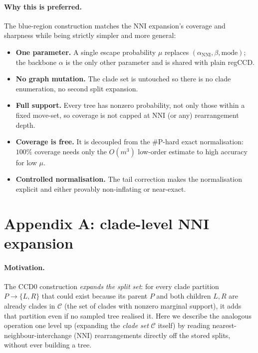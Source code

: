 \documentclass{article}
\newcommand{\CC}{\mathcal{C}}
\begin{document}
\paragraph{Why this is preferred.}
The blue-region construction matches the NNI expansion's coverage and sharpness
while being strictly simpler and more general:
\begin{itemize}
  \item \textbf{One parameter.} A single escape probability $\mu$ replaces
    $(\alpha_{\text{NNI}},\beta,\text{mode})$; the backbone $\alpha$ is the only
    other parameter and is shared with plain regCCD.
  \item \textbf{No graph mutation.} The clade set is untouched so there is no clade
    enumeration, no second split expansion.
  \item \textbf{Full support.} Every tree has nonzero probability, not only those
    within a fixed move-set, so coverage is not capped at NNI (or any) rearrangement
    depth.
  \item \textbf{Coverage is free.} It is decoupled from the \#P-hard exact
    normalisation: $100\%$ coverage needs only the $O(m^3)$ low-order estimate to high accuracy for low $\mu$.
  \item \textbf{Controlled normalisation.} The tail correction makes the
    normalisation explicit and either provably non-inflating or near-exact.
\end{itemize}


\clearpage

\appendix

\section*{Appendix A: clade-level NNI expansion}

\paragraph{Motivation.}
The CCD0 construction \emph{expands the split set}: for every clade partition
$P\to\{L,R\}$ that could exist because its parent $P$ and both children $L,R$ are
already clades in $\CC$ (the set of clades with nonzero marginal support), it
adds that partition even if no sampled tree realised it. Here we describe the
analogous operation one level up (expanding the \emph{clade set} $\CC$ itself)
by reading nearest-neighbour-interchange (NNI) rearrangements directly off
the stored splits, without ever building a tree.
\end{document}

